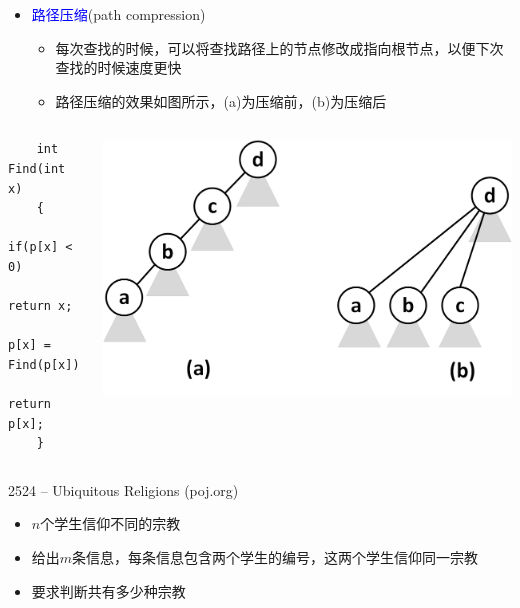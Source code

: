 \vspace*{3ex}
\begin{itemize}
    \item \textcolor{blue}{路径压缩}(path compression)
    \begin{itemize}
        \item 每次查找的时候，可以将查找路径上的节点修改成指向根节点，以便下次查找的时候速度更快
        \item 路径压缩的效果如图所示，(a)为压缩前，(b)为压缩后
    \end{itemize} 
\end{itemize}
\begin{columns}
    \begin{lstlisting}
    int Find(int x)
    {
        if(p[x] < 0)
            return x;
        p[x] = Find(p[x]);
        return p[x];
    }
    \end{lstlisting}
    \includegraphics[width=\textwidth,right]{fig/6-2.png}
\end{columns}
\begin{frame}{2524 -- Ubiquitous Religions (poj.org)}
    \begin{itemize}
        \item $n$个学生信仰不同的宗教
        \vfill
        \item 给出$m$条信息，每条信息包含两个学生的编号，这两个学生信仰同一宗教
        \vfill
        \item 要求判断共有多少种宗教
    \end{itemize}
\end{frame}
